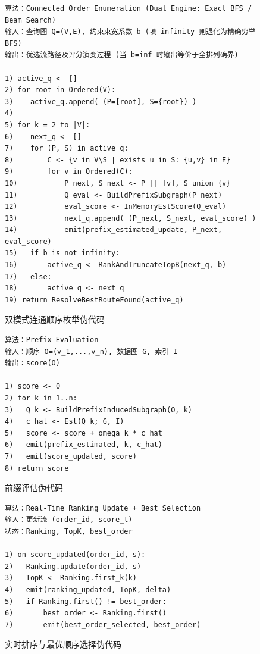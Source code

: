 \documentclass[12pt,a4paper]{article}
\begin{document}
\begin{figure}[htbp]
\centering
\begin{minipage}{0.94\textwidth}
\begin{lstlisting}
算法：Connected Order Enumeration (Dual Engine: Exact BFS / Beam Search)
输入：查询图 Q=(V,E), 约束束宽系数 b (填 infinity 则退化为精确穷举 BFS)
输出：优选流路径及评分演变过程 (当 b=inf 时输出等价于全排列确界)

1) active_q <- []
2) for root in Ordered(V): 
3)    active_q.append( (P=[root], S={root}) )
4) 
5) for k = 2 to |V|:
6)    next_q <- []
7)    for (P, S) in active_q:
8)        C <- {v in V\S | exists u in S: {u,v} in E}
9)        for v in Ordered(C):
10)           P_next, S_next <- P || [v], S union {v}
11)           Q_eval <- BuildPrefixSubgraph(P_next)
12)           eval_score <- InMemoryEstScore(Q_eval)
13)           next_q.append( (P_next, S_next, eval_score) )
14)           emit(prefix_estimated_update, P_next, eval_score)
15)   if b is not infinity:
16)       active_q <- RankAndTruncateTopB(next_q, b)
17)   else:
18)       active_q <- next_q
19) return ResolveBestRouteFound(active_q)
\end{lstlisting}
\end{minipage}
\caption{双模式连通顺序枚举伪代码}
\label{alg:enumeration}
\end{figure}

\begin{figure}[htbp]
\centering
\begin{minipage}{0.94\textwidth}
\begin{lstlisting}
算法：Prefix Evaluation
输入：顺序 O=(v_1,...,v_n), 数据图 G, 索引 I
输出：score(O)

1) score <- 0
2) for k in 1..n:
3)   Q_k <- BuildPrefixInducedSubgraph(O, k)
4)   c_hat <- Est(Q_k; G, I)
5)   score <- score + omega_k * c_hat
6)   emit(prefix_estimated, k, c_hat)
7)   emit(score_updated, score)
8) return score
\end{lstlisting}
\end{minipage}
\caption{前缀评估伪代码}
\label{alg:prefix-eval}
\end{figure}

\begin{figure}[htbp]
\centering
\begin{minipage}{0.94\textwidth}
\begin{lstlisting}
算法：Real-Time Ranking Update + Best Selection
输入：更新流 (order_id, score_t)
状态：Ranking, TopK, best_order

1) on score_updated(order_id, s):
2)   Ranking.update(order_id, s)
3)   TopK <- Ranking.first_k(k)
4)   emit(ranking_updated, TopK, delta)
5)   if Ranking.first() != best_order:
6)       best_order <- Ranking.first()
7)       emit(best_order_selected, best_order)
\end{lstlisting}
\end{minipage}
\caption{实时排序与最优顺序选择伪代码}
\label{alg:ranking-best}
\end{figure}
\end{document}
